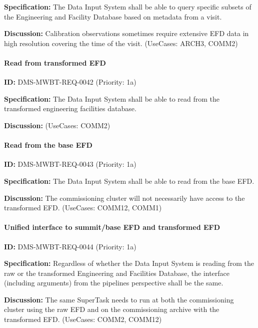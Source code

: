 \documentclass[SE,toc,lsstdraft]{lsstdoc}
\begin{document}
\textbf{Specification:}
The Data Input System shall be able to query specific subsets of the Engineering and Facility Database based on metadata from a visit.

\textbf{Discussion:}
Calibration observations sometimes require extensive EFD data in high resolution covering the time of the visit. (UseCases: ARCH3, COMM2)

\paragraph{Read from transformed EFD}\hfill  %

\label{DMS-MWBT-REQ-0042}
\textbf{ID:} DMS-MWBT-REQ-0042 (Priority: 1a)

\textbf{Specification:}
The Data Input System shall be able to read from the transformed engineering facilities database.

\textbf{Discussion:}
(UseCases: COMM2)

\paragraph{Read from the base EFD}\hfill  %

\label{DMS-MWBT-REQ-0043}
\textbf{ID:} DMS-MWBT-REQ-0043 (Priority: 1a)

\textbf{Specification:}
The Data Input System shall be able to read from the base EFD.

\textbf{Discussion:}
The commissioning cluster will not necessarily have access to the transformed EFD. (UseCases: COMM12, COMM1)

\paragraph{Unified interface to summit/base EFD and transformed EFD}\hfill  %

\label{DMS-MWBT-REQ-0044}
\textbf{ID:} DMS-MWBT-REQ-0044 (Priority: 1a)

\textbf{Specification:}
Regardless of whether the Data Input System is reading from the raw or the transformed Engineering and Facilities Database, the interface (including arguments) from the pipelines perspective shall be the same.

\textbf{Discussion:}
The same SuperTask needs to run at both the commissioning cluster using the raw EFD and on the commissioning archive with the transformed EFD. (UseCases: COMM2, COMM12)
\end{document}
